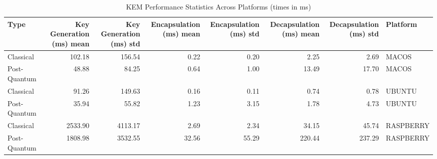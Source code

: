 \begin{table}
\caption{KEM Performance Statistics Across Platforms (times in ms)}
\label{tab:kem_platform_stats}
\begin{tabular}{lrrrrrrl}
\toprule
Type & Key Generation (ms) mean & Key Generation (ms) std & Encapsulation (ms) mean & Encapsulation (ms) std & Decapsulation (ms) mean & Decapsulation (ms) std & Platform \\
\midrule
Classical & 102.18 & 156.54 & 0.22 & 0.20 & 2.25 & 2.69 & MACOS \\
Post-Quantum & 48.88 & 84.25 & 0.64 & 1.00 & 13.49 & 17.70 & MACOS \\
Classical & 91.26 & 149.63 & 0.16 & 0.11 & 0.74 & 0.78 & UBUNTU \\
Post-Quantum & 35.94 & 55.82 & 1.23 & 3.15 & 1.78 & 4.73 & UBUNTU \\
Classical & 2533.90 & 4113.17 & 2.69 & 2.34 & 34.15 & 45.74 & RASPBERRY \\
Post-Quantum & 1808.98 & 3532.55 & 32.56 & 55.29 & 220.44 & 237.29 & RASPBERRY \\
\bottomrule
\end{tabular}
\end{table}
